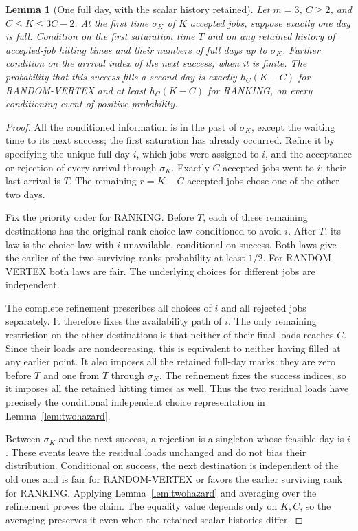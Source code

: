 \documentclass[11pt]{article}
\newtheorem{lemma}{Lemma}
\begin{document}
\begin{lemma}[One full day, with the scalar history retained]\label{lem:historyhazard}
Let $m=3$, $C\geq2$, and $C\leq K\leq3C-2$. At the first time
$\sigma_K$ of $K$ accepted jobs, suppose exactly one day is full.
Condition on the first saturation time $T$ and on any retained history
of accepted-job hitting times and their numbers of full days up to
$\sigma_K$. Further condition on the arrival index of the next success,
when it is finite. The probability that this success fills a second day
is exactly $h_C(K-C)$ for RANDOM-VERTEX and at least $h_C(K-C)$ for
RANKING, on every conditioning event of positive probability.
\end{lemma}
\begin{proof}
All the conditioned information is in the past of $\sigma_K$, except
the waiting time to its next success; the first saturation has already
occurred. Refine it by specifying the unique full day $i$, which jobs
were assigned to $i$, and the acceptance or rejection of every arrival
through $\sigma_K$. Exactly $C$ accepted jobs went to $i$; their last
arrival is $T$. The remaining $r=K-C$ accepted jobs chose one of the
other two days.

Fix the priority order for RANKING. Before $T$, each of these remaining
destinations has the original rank-choice law conditioned to avoid $i$.
After $T$, its law is the choice law with $i$ unavailable, conditional
on success. Both laws give the earlier of the two surviving ranks
probability at least $1/2$. For RANDOM-VERTEX both laws are fair.
The underlying choices for different jobs are independent.

The complete refinement prescribes all choices of $i$ and all rejected
jobs separately. It therefore fixes the availability path of $i$.
The only remaining restriction on the other destinations is that neither
of their final loads reaches $C$. Since their loads are nondecreasing,
this is equivalent to neither having filled at any earlier point.
It also imposes all the retained full-day marks: they are zero before
$T$ and one from $T$ through $\sigma_K$. The refinement fixes the
success indices, so it imposes all the retained hitting times as well.
Thus the two residual loads have precisely the conditional independent
choice representation in Lemma~\ref{lem:twohazard}.

Between $\sigma_K$ and the next success, a rejection is a singleton
whose feasible day is $i$. These events leave the residual loads
unchanged and do not bias their distribution. Conditional on success,
the next destination is independent of the old ones and is fair for
RANDOM-VERTEX or favors the earlier surviving rank for RANKING.
Applying Lemma~\ref{lem:twohazard} and averaging over the refinement
proves the claim. The equality value depends only on $K,C$, so the
averaging preserves it even when the retained scalar histories differ.
\end{proof}
\end{document}
